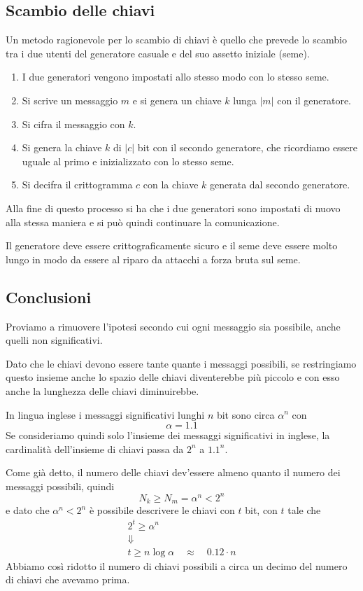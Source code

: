 \subsection{Scambio delle chiavi}\label{chiavi_otp}
Un metodo ragionevole per lo scambio di chiavi \`e quello che prevede lo scambio tra i due utenti del generatore casuale
e del suo assetto iniziale (seme).
\begin{enumerate}
	\item I due generatori vengono impostati allo stesso modo con lo stesso seme.
	\item Si scrive un messaggio $m$ e si genera un chiave $k$ lunga $|m|$ con il generatore.
	\item Si cifra il messaggio con $k$.
	\item Si genera la chiave $k$ di $|c|$ bit con il secondo generatore, che ricordiamo essere uguale al primo e
	      inizializzato con lo stesso seme.
	\item Si decifra il crittogramma $c$ con la chiave $k$ generata dal secondo generatore.
\end{enumerate}
Alla fine di questo processo si ha che i due generatori sono impostati di nuovo alla stessa maniera e si pu\`o quindi
continuare la comunicazione.

Il generatore deve essere crittograficamente sicuro e il seme deve essere molto lungo in modo da essere al riparo da
attacchi a forza bruta sul seme.

\subsection{Conclusioni}\label{conclusioni_otp}
Proviamo a rimuovere l'ipotesi secondo cui ogni messaggio sia possibile, anche quelli non significativi.

Dato che le chiavi devono essere tante quante i messaggi possibili, se restringiamo questo insieme anche lo spazio
delle chiavi diventerebbe pi\`u piccolo e con esso anche la lunghezza delle chiavi diminuirebbe.

In lingua inglese i messaggi significativi lunghi $n$ bit sono circa $\alpha^n$ con
\[ \alpha = 1.1 \]
Se consideriamo quindi solo l'insieme dei messaggi significativi in inglese, la cardinalit\`a dell'insieme di chiavi
passa da $2^n$ a $1.1^n$.

Come gi\`a detto, il numero delle chiavi dev'essere almeno quanto il numero dei messaggi possibili, quindi
\[ N_k \geq N_m = \alpha^n < 2^n \]
e dato che $\alpha^n < 2^n$ \`e possibile descrivere le chiavi con $t$ bit, con $t$ tale che
\begin{gather*}
	2^t \geq \alpha^n \\
	\Downarrow \\
	t \geq n \log \alpha \quad \approx \quad 0.12 \cdot n
\end{gather*}
Abbiamo cos\`i ridotto il numero di chiavi possibili a circa un decimo del numero di chiavi che avevamo prima.

